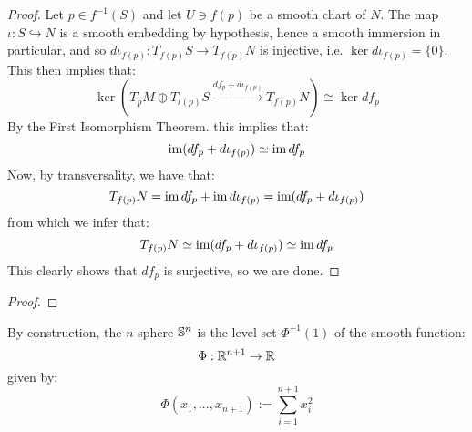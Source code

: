 \begin{proof}
                Let $p \in f^{-1}(S)$ and let $U \ni f(p)$ be a smooth chart of $N$. The map $\iota: S \hookrightarrow N$ is a smooth embedding by hypothesis, hence a smooth immersion in particular, and so $d\iota_{f(p)}: T_{f(p)}S \to T_{f(p)}N$ is injective, i.e. $\ker d\iota_{f(p)} = \{0\}$. This then implies that:
                    $$\ker\left( T_pM \oplus T_{\iota(p)}S \xrightarrow[]{df_p + d\iota_{f(p)}} T_{f(p)}N \right) \cong \ker df_p$$
                By the First Isomorphism Theorem. this implies that:
                    $$\operatorname{im}(df_p + d\iota_{f(p)}) \simeq \operatorname{im} df_p$$
                Now, by transversality, we have that:
                    $$T_{f(p)}N = \operatorname{im} df_p + \operatorname{im} d\iota_{f(p)} = \operatorname{im}( df_p + d\iota_{f(p)} )$$
                from which we infer that:
                    $$T_{f(p)}N \simeq \operatorname{im}(df_p + d\iota_{f(p)}) \simeq \operatorname{im} df_p$$
                This clearly shows that $df_p$ is surjective, so we are done.
            \end{proof}
        \begin{theorem} \label{theorem: transversal_intersections}
            
        \end{theorem}
            \begin{proof}
                
            \end{proof}

        \begin{example} \label{example: smooth_structures_on_spheres}
            By construction, the $n$-sphere $\mathbb{S}^n$ is the level set $\Phi^{-1}(1)$ of the smooth function:
                $$\Phi: \mathbb{R}^{n + 1} \to \mathbb{R}$$
            given by:
                $$\Phi(x_1, ..., x_{n + 1}) := \sum_{i = 1}^{n + 1} x_i^2$$
        \end{example}
